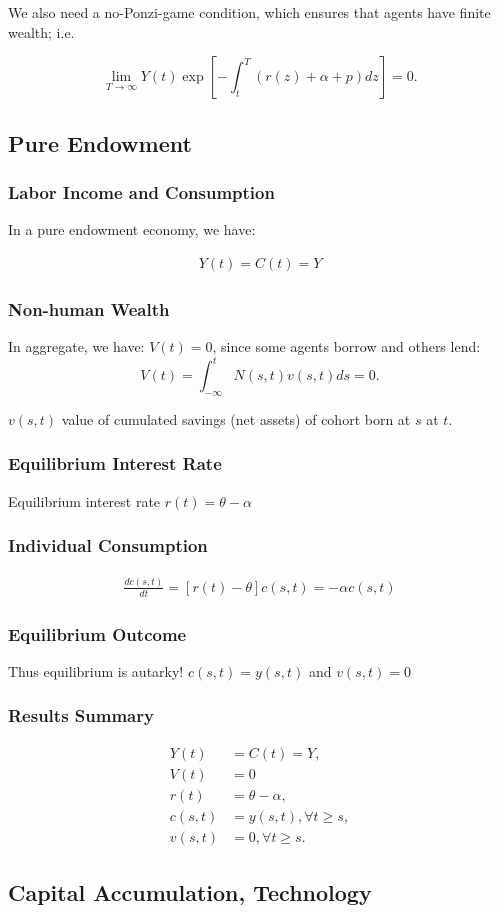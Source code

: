 \documentclass[10pt]{article}
\begin{document}
We also need a no-Ponzi-game condition, which ensures that agents have finite wealth; i.e.

$$
\lim _{T \rightarrow \infty} Y(t) \exp \left[-\int_t^T(r(z)+\alpha+p) d z\right]=0 .
$$

\subsection{Pure Endowment}

\subsubsection{Labor Income and Consumption}

In a pure endowment economy, we have:

\begin{align}
    Y(t)=C(t)=Y
\end{align}

\subsubsection{Non-human Wealth}

In aggregate, we have:
$V(t)=0$, since some agents borrow and others lend:
$$
V(t)=\int_{-\infty}^t N(s, t) v(s, t) d s=0 .
$$

$v(s, t)$ value of cumulated savings (net assets) of cohort born at $s$ at $t$.

\subsubsection{Equilibrium Interest Rate}

Equilibrium interest rate $r(t)=\theta-\alpha$

\subsubsection{Individual Consumption}

\begin{align}
    \frac{d c(s, t)}{d t}=[r(t)-\theta] c(s, t)=-\alpha c(s, t)
\end{align}

\subsubsection{Equilibrium Outcome}

Thus equilibrium is autarky! $c(s, t)=y(s, t)$ and $v(s, t)=0$

\subsubsection{Results Summary}

\begin{align}
    Y(t) & =C(t)=Y, \\
    V(t) & =0 \\
    r(t) & =\theta-\alpha, \\
    c(s, t) & =y(s, t), \forall t \geq s, \\
    v(s, t) & =0, \forall t \geq s .
\end{align}

\subsection{Capital Accumulation, Technology}
\end{document}
